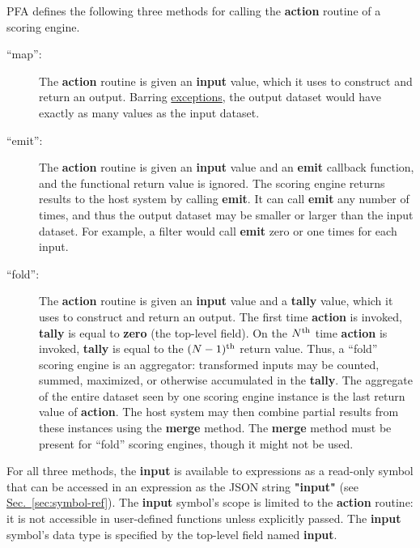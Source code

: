 \documentclass{article}
\newcommand{\PFAc}{\ttfamily\bfseries}
\newenvironment{allowedfields}%
  {\begin{center} \begin{minipage}{0.9\linewidth} \begin{description}}%
  {\end{description} \end{minipage} \end{center}}
\theoremstyle{definition}
\begin{document}
PFA defines the following three methods for calling the {\PFAc action} routine of a scoring engine.
\begin{allowedfields}
\item[``map'':] The {\PFAc action} routine is given an {\PFAc input} value, which it uses to construct and return an output.  Barring \hyperlink{hsec:exceptions}{exceptions}, the output dataset would have exactly as many values as the input dataset.
\end{allowedfields}
\begin{allowedfields}
\item[``emit'':] The {\PFAc action} routine is given an {\PFAc input} value and an {\PFAc emit} callback function, and the functional return value is ignored.  The scoring engine returns results to the host system by calling {\PFAc emit}.  It can call {\PFAc emit} any number of times, and thus the output dataset may be smaller or larger than the input dataset.  For example, a filter would call {\PFAc emit} zero or one times for each input.
\end{allowedfields}
\begin{allowedfields}
\item[``fold'':] The {\PFAc action} routine is given an {\PFAc input} value and a {\PFAc tally} value, which it uses to construct and return an output.  The first time {\PFAc action} is invoked, {\PFAc tally} is equal to {\PFAc zero} (the top-level field).  On the $N^{\mbox{\scriptsize th}}$ time {\PFAc action} is invoked, {\PFAc tally} is equal to the $(N - 1)^{\mbox{\scriptsize th}}$ return value.  Thus, a ``fold'' scoring engine is an aggregator: transformed inputs may be counted, summed, maximized, or otherwise accumulated in the {\PFAc tally}.  The aggregate of the entire dataset seen by one scoring engine instance is the last return value of {\PFAc action}.  The host system may then combine partial results from these instances using the {\PFAc merge} method.  The {\PFAc merge} method must be present for ``fold'' scoring engines, though it might not be used.
\end{allowedfields}

For all three methods, the {\PFAc input} is available to expressions as a read-only symbol that can be accessed in an expression as the JSON string {\PFAc "input"} (see \hyperlink{hsec:symbol-ref}{Sec.~\ref{sec:symbol-ref}}).  The {\PFAc input} symbol's scope is limited to the {\PFAc action} routine: it is not accessible in user-defined functions unless explicitly passed.  The {\PFAc input} symbol's data type is specified by the top-level field named {\PFAc input}.
\end{document}
